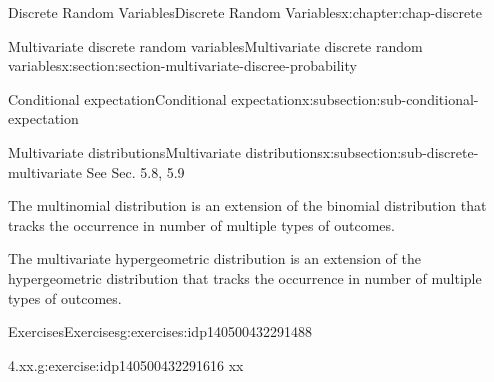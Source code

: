 \documentclass[oneside,10pt,]{book}
\begin{document}
\begin{chapterptx}{Discrete Random Variables}{}{Discrete Random Variables}{}{}{x:chapter:chap-discrete}
\begin{sectionptx}{Multivariate discrete random variables}{}{Multivariate discrete random variables}{}{}{x:section:section-multivariate-discree-probability}
\begin{subsectionptx}{Conditional expectation}{}{Conditional expectation}{}{}{x:subsection:sub-conditional-expectation}
\end{subsectionptx}
%
%
\typeout{************************************************}
\typeout{************************************************}
%
\begin{subsectionptx}{Multivariate distributions}{}{Multivariate distributions}{}{}{x:subsection:sub-discrete-multivariate}
See Sec. 5.8, 5.9%
\begin{introduction}{}%
The multinomial distribution is an extension of the binomial distribution that tracks the occurrence in number of multiple types of outcomes.%
\par
The multivariate hypergeometric distribution is an extension of the hypergeometric distribution that tracks the occurrence in number of multiple types of outcomes.%
\end{introduction}%
\end{subsectionptx}
%
%
\typeout{************************************************}
\typeout{************************************************}
%
\begin{exercises-subsection}{Exercises}{}{Exercises}{}{}{g:exercises:idp140500432291488}
\begin{divisionexercise}{1}{4.xx.}{}{g:exercise:idp140500432291616}%
xx%
\end{divisionexercise}%
\end{exercises-subsection}
\end{sectionptx}
\end{chapterptx}
%
%
\typeout{************************************************}
\typeout{************************************************}
%
\end{document}
